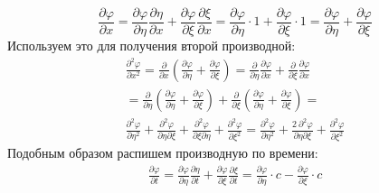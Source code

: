 \documentclass[14pt,a4paper,oneside]{extarticle}	%
\begin{document}
\begin{equation}\label{21}
\frac{\partial \varphi}{\partial x} = \frac{\partial \varphi}{\partial \eta}\frac{\partial \eta}{\partial x} + \frac{\partial \varphi}{\partial \xi}\frac{\partial \xi}{\partial x} =  \frac{\partial \varphi}{\partial \eta}\cdot 1 + \frac{\partial \varphi}{\partial \xi}\cdot 1 = \frac{\partial \varphi}{\partial \eta} + \frac{\partial \varphi}{\partial \xi}
\end{equation}
 Используем это для получения второй производной:
 \begin{eqnarray*}
 \frac{\partial^{2} \varphi}{\partial x^{2}} = \frac{\partial}{\partial x} \left( \frac{\partial \varphi}{\partial \eta} + \frac{\partial \varphi}{\partial \xi} \right) = \frac{\partial }{\partial \eta}\frac{\partial \varphi}{\partial x} + \frac{\partial}{\partial \xi}\frac{\partial \varphi}{\partial x} \\
  = \frac{\partial }{\partial \eta} \left( \frac{\partial \varphi}{\partial \eta} + \frac{\partial \varphi}{\partial \xi} \right) + \frac{\partial }{\partial \xi} \left( \frac{\partial \varphi}{\partial \eta} + \frac{\partial \varphi}{\partial \xi} \right) = \\
   \frac{\partial^{2} \varphi}{\partial \eta^{2}} + \frac{\partial^{2} \varphi}{\partial \eta \partial \xi} + \frac{\partial^{2} \varphi}{\partial \xi \partial \eta} + \frac{\partial^{2} \varphi}{\partial \xi^{2}} = 
      \frac{\partial^{2} \varphi}{\partial \eta^{2}} + \frac{2\:\partial^{2} \varphi}{\partial \eta \partial \xi} +  \frac{\partial^{2} \varphi}{\partial \xi^{2}}
 \end{eqnarray*}
Подобным образом распишем производную по времени:
\begin{eqnarray}\label{23}
\frac{\partial \varphi}{\partial t} = \frac{\partial \varphi}{\partial \eta}\frac{\partial \eta}{\partial t} + \frac{\partial \varphi}{\partial \xi}\frac{\partial \xi}{\partial t} = \frac{\partial \varphi}{\partial \eta}\cdot c - \frac{\partial \varphi}{\partial \xi}\cdot c
\end{eqnarray}
\end{document}
